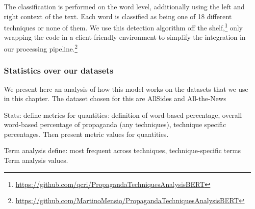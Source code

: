 The classification is performed on the word level, additionally using the left and right context of the text. Each word is classified as being one of 18 different techniques or none of them.
We use this detection algorithm off the shelf,\footnote{\url{https://github.com/qcri/PropagandaTechniquesAnalysisBERT}} only wrapping the code in a client-friendly environment to simplify the integration in our processing pipeline.\footnote{\url{https://github.com/MartinoMensio/PropagandaTechniquesAnalysisBERT}}


\subsubsection{\statusred Statistics over our datasets}
\label{ssec:lp_techniques_propaganda_stats}

We present here an analysis of how this model works on the datasets that we use in this chapter.
The dataset chosen for this are AllSides and All-the-News

Stats: 
define metrics for quantities: definition of word-based percentage, overall word-based percentage of propaganda (any techniques), technique specific percentages.
Then present metric values for quantities.

Term analysis define: most frequent across techniques, technique-specific terms
Term analysis values.





